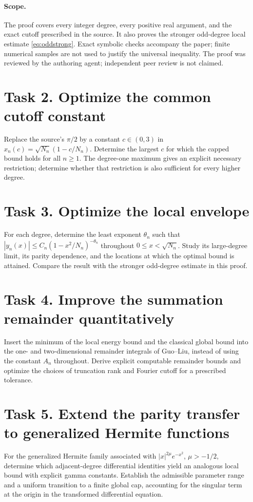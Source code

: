 \documentclass[11pt]{article}
\begin{document}
\paragraph{Scope.}
The proof covers every integer degree, every positive real argument,
and the exact cutoff prescribed in the source. It also proves the
stronger odd-degree local estimate \eqref{eq:oddstrong}. Exact symbolic
checks accompany the paper; finite numerical samples are not used to
justify the universal inequality. The proof was reviewed by the
authoring agent; independent peer review is not claimed.

\section*{Task 2. Optimize the common cutoff constant}
Replace the source's $\pi/2$ by a constant $c\in(0,3)$ in
$x_n(c)=\sqrt{N_n}(1-c/N_n)$. Determine the largest $c$ for which the
capped bound holds for all $n\ge1$. The degree-one maximum gives an
explicit necessary restriction; determine whether that restriction is
also sufficient for every higher degree.

\section*{Task 3. Optimize the local envelope}
For each degree, determine the least exponent $\theta_n$ such that
$|y_n(x)|\le C_n(1-x^2/N_n)^{-\theta_n}$ throughout
$0\le x<\sqrt{N_n}$. Study its large-degree limit, its parity dependence,
and the locations at which the optimal bound is attained. Compare the
result with the stronger odd-degree estimate in this proof.

\section*{Task 4. Improve the summation remainder quantitatively}
Insert the minimum of the local energy bound and the classical global
bound into the one- and two-dimensional remainder integrals of
Guo--Liu, instead of using the constant $A_n$ throughout. Derive explicit
computable remainder bounds and optimize the choices of truncation
rank and Fourier cutoff for a prescribed tolerance.

\section*{Task 5. Extend the parity transfer to generalized Hermite functions}
For the generalized Hermite family associated with
$|x|^{2\mu}e^{-x^2}$, $\mu>-1/2$, determine which adjacent-degree
differential identities yield an analogous local bound with explicit
gamma constants. Establish the admissible parameter range and a
uniform transition to a finite global cap, accounting for the singular
term at the origin in the transformed differential equation.
\end{document}
